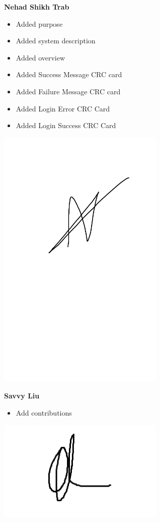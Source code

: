 \documentclass[]{article}
\begin{document}
\textbf{Nehad Shikh Trab}
\begin{itemize}
    \setlength\itemindent{2em}
\item Added purpose
\item Added system description
\item Added overview
\item Added Success Message CRC card
\item Added Failure Message CRC card
\item Added Login Error CRC Card
\item Added Login Success CRC Card
\end{itemize}
\includegraphics[width=0.6\textwidth]{Nehad.png}

\textbf{Savvy Liu}
\begin{itemize}
\setlength\itemindent{2em}
\item Add contributions 
\end{itemize} 
\includegraphics[width=0.6\textwidth]{Savvy.png}
\end{document}
